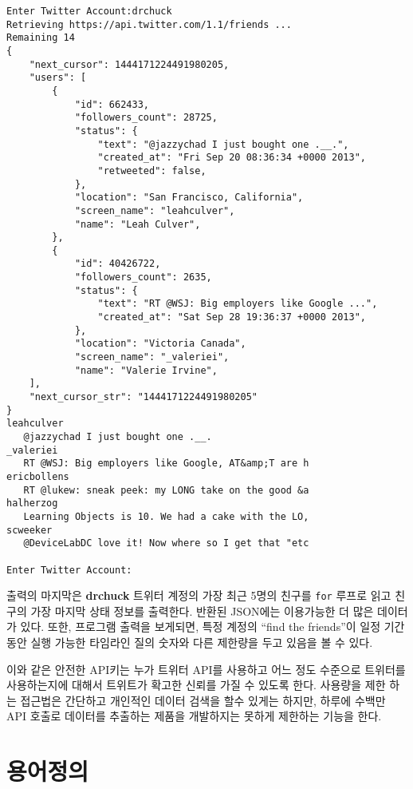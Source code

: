 \beforeverb
\begin{verbatim}
Enter Twitter Account:drchuck
Retrieving https://api.twitter.com/1.1/friends ...
Remaining 14
{
    "next_cursor": 1444171224491980205, 
    "users": [
        {
            "id": 662433, 
            "followers_count": 28725, 
            "status": {
                "text": "@jazzychad I just bought one .__.", 
                "created_at": "Fri Sep 20 08:36:34 +0000 2013", 
                "retweeted": false, 
            }, 
            "location": "San Francisco, California", 
            "screen_name": "leahculver", 
            "name": "Leah Culver", 
        }, 
        {
            "id": 40426722, 
            "followers_count": 2635, 
            "status": {
                "text": "RT @WSJ: Big employers like Google ...", 
                "created_at": "Sat Sep 28 19:36:37 +0000 2013", 
            }, 
            "location": "Victoria Canada", 
            "screen_name": "_valeriei", 
            "name": "Valerie Irvine", 
    ], 
    "next_cursor_str": "1444171224491980205"
}
leahculver
   @jazzychad I just bought one .__.
_valeriei
   RT @WSJ: Big employers like Google, AT&amp;T are h
ericbollens
   RT @lukew: sneak peek: my LONG take on the good &a
halherzog
   Learning Objects is 10. We had a cake with the LO,
scweeker
   @DeviceLabDC love it! Now where so I get that "etc

Enter Twitter Account:
\end{verbatim}
\afterverb
%

출력의 마지막은 {\bf drchuck} 트위터 계정의 가장 최근 5명의 친구를 {\tt for} 루프로 읽고
친구의 가장 마지막 상태 정보를 출력한다. 반환된 JSON에는 이용가능한 더 많은 데이터가 있다.
또한, 프로그램 출력을 보게되면, 특정 계정의 ``find the friends''이 일정 기간동안 실행 가능한 타임라인 질의 숫자와
다른 제한량을 두고 있음을 볼 수 있다.

이와 같은 안전한 API키는 누가 트위터 API를 사용하고 어느 정도 수준으로 트위터를 사용하는지에 대해서 
트위트가 확고한 신뢰를 가질 수 있도록 한다. 사용량을 제한 하는 접근법은 간단하고 개인적인 데이터 검색을 
할수 있게는 하지만, 하루에 수백만 API 호출로 데이터를 추출하는 제품을 개발하지는 못하게 제한하는 기능을 한다.

\section{용어정의}

